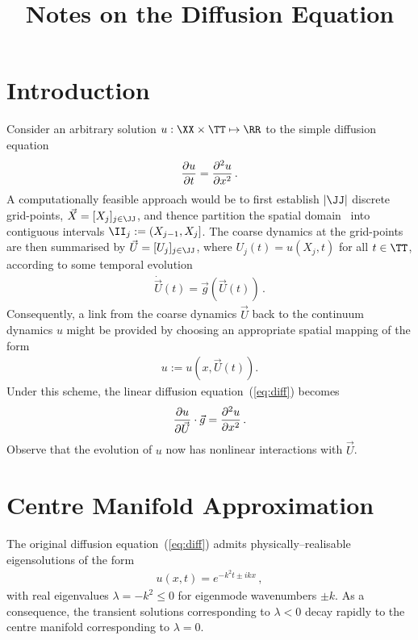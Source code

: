 \documentclass[12pt,a5paper]{article}
\title{Notes on the Diffusion Equation}
\begin{document}
\maketitle
\section{Introduction}
Consider an arbitrary solution $u:\XX\times \TT\mapsto \RR$ to the simple diffusion equation 
\begin{eqnarray}
	\D tu = \DD xu\,.
	\label{eq:diff}
\end{eqnarray}
A computationally feasible approach would be to 
first establish $|{\JJ}|$ discrete grid-points,
${\vec X}=[X_j]_{j\in\JJ}$, and thence
partition the spatial domain \XX\ into 
contiguous intervals \(\II_j:=(X_{j-1},X_j]\). 
The coarse dynamics at the grid-points are then summarised by
${\vec U}=[U_j]_{j\in\JJ}$, where $U_j(t)=u(X_j,t)$ for all $t\in \TT$, according to some temporal evolution
\begin{eqnarray}
	\dot{\vec U}(t) = {\vec g}({\vec U}(t))\,.
	\label{eq:temporal}
\end{eqnarray}
Consequently, a link from the coarse dynamics ${\vec U}$ back to the continuum dynamics $u$ might be provided
by choosing an appropriate spatial mapping of the form
\begin{eqnarray}
	u  := u(x,{\vec U}(t)).
	\label{eq:spatial}
\end{eqnarray}
Under this scheme, the linear diffusion equation~(\ref{eq:diff}) becomes
\begin{eqnarray}
	\D {\vec U}{u}\cdot{\vec g} = \DD x{u}\,.
	\label{eq:diff2}
\end{eqnarray}
Observe that the evolution of $u$ now has nonlinear interactions with ${\vec U}$.

\section{Centre Manifold Approximation}
The original diffusion equation~(\ref{eq:diff}) admits 
physically--realisable eigensolutions of the form
\begin{eqnarray}
	u(x,t)  = e^{-k^2 t\pm ikx}\,,
\label{eq:raw-eigmode}
\end{eqnarray}
with real eigenvalues $\lambda=-k^2\le 0$ for 
eigenmode wavenumbers $\pm k$. 
As a consequence, the transient solutions corresponding
to $\lambda<0$ decay rapidly to the centre manifold corresponding to $\lambda=0$. 
\end{document}
